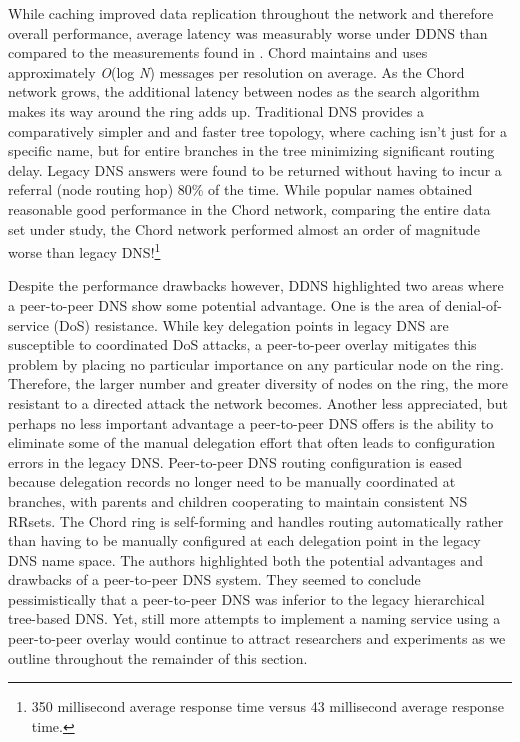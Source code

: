 \documentclass[sigconf]{acmart}
\begin{document}
While caching improved data replication throughout the network and
therefore overall performance, average latency was measurably worse under
DDNS than compared to the measurements found in \cite{jung_dns_2002}.
Chord maintains and uses approximately \emph{O}(log \emph{N}) messages
per resolution on average.  As the Chord network grows, the additional
latency between nodes as the search algorithm makes its way around the
ring adds up.  Traditional DNS provides a comparatively simpler and
and faster tree topology, where caching isn't just for a specific name,
but for entire branches in the tree minimizing significant routing
delay.  Legacy DNS answers were found to be returned without having to
incur a referral (node routing hop) 80\% of the time.  While popular
names obtained reasonable good performance in the Chord network,
comparing the entire data set under study, the Chord network performed
almost an order of magnitude worse than legacy DNS!\footnote{350
millisecond average response time versus 43 millisecond average response
time.}

Despite the performance drawbacks however, DDNS highlighted two areas
where a peer-to-peer DNS show some potential advantage.  One is the area
of denial-of-service (DoS) resistance.  While key delegation points in
legacy DNS are susceptible to coordinated DoS attacks, a peer-to-peer
overlay mitigates this problem by placing no particular importance on
any particular node on the ring.  Therefore, the larger number and
greater diversity of nodes on the ring, the more resistant to a directed
attack the network becomes.  Another less appreciated, but perhaps no
less important advantage a peer-to-peer DNS offers is the ability to
eliminate some of the manual delegation effort that often leads to
configuration errors in the legacy DNS.  Peer-to-peer DNS routing
configuration is eased because delegation records no longer need to be
manually coordinated at branches, with parents and children cooperating
to maintain consistent NS RRsets.  The Chord ring is self-forming and
handles routing automatically rather than having to be manually
configured at each delegation point in the legacy DNS name space.  The
authors highlighted both the potential advantages and drawbacks of a
peer-to-peer DNS system.  They seemed to conclude pessimistically that a
peer-to-peer DNS was inferior to the legacy hierarchical tree-based DNS.
Yet, still more attempts to implement a naming service using a
peer-to-peer overlay would continue to attract researchers and
experiments as we outline throughout the remainder of this section.
\end{document}
